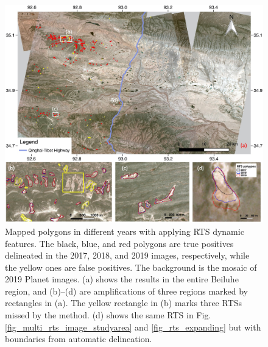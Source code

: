 \documentclass[authoryear,preprint,review,12pt]{elsarticle}
\begin{document}
\begin{figure} 
	\centering
	\includegraphics[width=14cm]{figs/multi_mapping_results_v2_trim.jpg}
	\caption{Mapped polygons in different years with applying RTS dynamic features. The black, blue, and red polygons are true positives delineated in the 2017, 2018, and 2019 images, respectively, while the yellow ones are false  positives. The background is the mosaic of 2019 Planet images. (a) shows the results in the entire Beiluhe region, and (b)--(d) are amplifications of three regions marked by rectangles in (a). The yellow rectangle in (b) marks three RTSs missed by the method. (d) shows the same RTS in Fig. \ref{fig_multi_rts_image_studyarea} and \ref{fig_rts_expanding} but with boundaries from automatic delineation.}
	\label{fig_mapping_results}
\end{figure}
\end{document}
